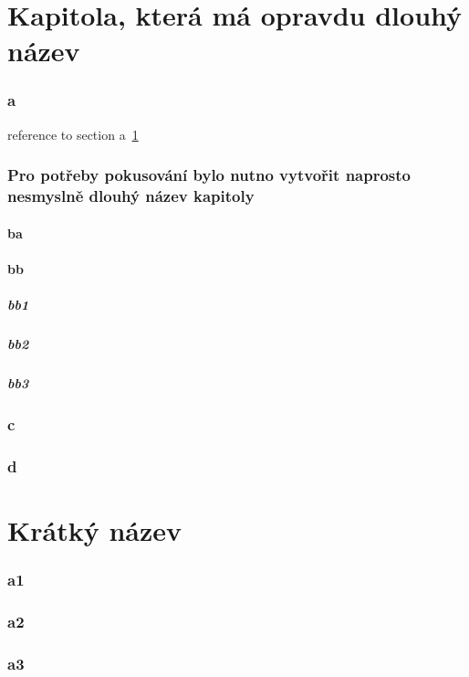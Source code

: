 \part{Kapitola, která má opravdu dlouhý název}
\lipsum[2]
\section{a}\label{sec:a}
\lipsum [2]
reference to section a~\ref{sec:a}
\section{Pro potřeby pokusování bylo nutno vytvořit naprosto nesmyslně dlouhý název kapitoly}\lipsum
\subsection{ba}\lipsum [3]
\subsection{bb}\lipsum
\subsubsection{bb1}\lipsum [6]
\subsubsection{bb2}\lipsum
\subsubsection{bb3}\lipsum [4] 
\section{c}\lipsum
\section{d}\lipsum [1]
\clearpage
\part{Krátký název}
\lipsum[2]
\section{a1}
\section{a2}
\section{a3}
